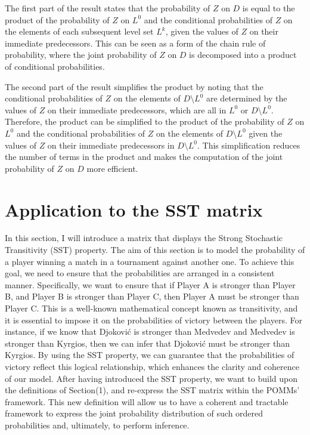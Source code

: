 \documentclass[11pt]{amsart}
\begin{document}
The first part of the result states that the probability of $Z$ on $D$ is equal to the product of the probability of $Z$ on $L^0$ and the conditional probabilities of $Z$ on the elements of each subsequent level set $L^k$, given the values of $Z$ on their immediate predecessors. This can be seen as a form of the chain rule of probability, where the joint probability of $Z$ on $D$ is decomposed into a product of conditional probabilities.

The second part of the result simplifies the product by noting that the conditional probabilities of $Z$ on the elements of $D\setminus L^0$ are determined by the values of $Z$ on their immediate predecessors, which are all in $L^0$ or $D\setminus L^0$. Therefore, the product can be simplified to the product of the probability of $Z$ on $L^0$ and the conditional probabilities of $Z$ on the elements of $D\setminus L^0$ given the values of $Z$ on their immediate predecessors in $D\setminus L^0$. This simplification reduces the number of terms in the product and makes the computation of the joint probability of $Z$ on $D$ more efficient.




\newpage







\section{Application to the SST matrix}



In this section, I will introduce a matrix that displays the Strong Stochastic Transitivity (SST) property. The aim of this section is to model the probability of a player winning a match in a tournament against another one. To achieve this goal, we need to ensure that the probabilities are arranged in a consistent manner. Specifically, we want to ensure that if Player A is stronger than Player B, and Player B is stronger than Player C, then Player A must be stronger than Player C. This is a well-known mathematical concept known as transitivity, and it is essential to impose it on the probabilities of victory between the players. For instance, if we know that Djoković is stronger than Medvedev and Medvedev is stronger than Kyrgios, then we can infer that Djoković must be stronger than Kyrgios. By using the SST property, we can guarantee that the probabilities of victory reflect this logical relationship, which enhances the clarity and coherence of our model.
After having introduced the SST property, we want to build upon the definitions of Section(1), and re-express the SST matrix within the POMMs' framework. This new definition will allow us to have a coherent and tractable framework to express the joint probability distribution of such ordered probabilities and, ultimately, to perform inference.
\end{document}

